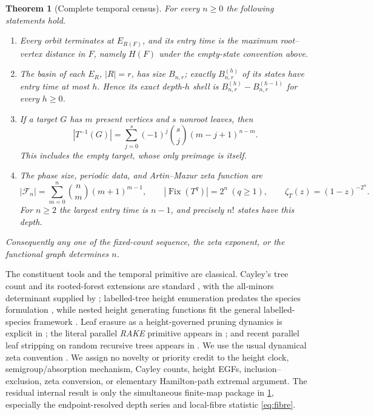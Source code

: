 \documentclass[10pt,a4paper]{amsart}
\newtheorem{theorem}{Theorem}
\theoremstyle{definition}
\newcommand{\F}{\mathcal F}
\newcommand{\Fix}{\operatorname{Fix}}
\begin{document}
\begin{theorem}[Complete temporal census]\label{thm:main}
For every $n\geq0$ the following statements hold.
\begin{enumerate}[label=\textup{(\roman*)}]
\item Every orbit terminates at $E_{R(F)}$, and its entry time is the maximum
root--vertex distance in $F$, namely $H(F)$ under the empty-state convention
above.
\item The basin of each $E_R$, $|R|=r$, has size $B_{n,r}$; exactly
$B_{n,r}^{(h)}$ of its states have entry time at most $h$.  Hence its exact
depth-$h$ shell is $B_{n,r}^{(h)}-B_{n,r}^{(h-1)}$ for every $h\geq0$.
\item If a target $G$ has $m$ present vertices and $s$ nonroot leaves, then
\[
 |T^{-1}(G)|=\sum_{j=0}^{s}(-1)^j\binom{s}{j}(m-j+1)^{n-m}.   \tag{1.5}\label{eq:fibre}
\]
This includes the empty target, whose only preimage is itself.
\item The phase size, periodic data, and Artin--Mazur zeta function are
\[
 |\F_n|=\sum_{m=0}^{n}\binom nm(m+1)^{m-1},\qquad
 |\Fix(T^q)|=2^n\ (q\geq1),\qquad
 \zeta_T(z)=(1-z)^{-2^n}.                                    \tag{1.6}\label{eq:periodic}
\]
For $n\geq2$ the largest entry time is $n-1$, and precisely $n!$ states have
this depth.
\end{enumerate}
Consequently any one of the fixed-count sequence, the zeta exponent, or the
functional graph determines $n$.
\end{theorem}

The constituent tools and the temporal primitive are classical.  Cayley's
tree count and its rooted-forest extensions are standard
\cite{Cayley1889,Moon1970}, with the all-minors determinant supplied by
\cite{Chaiken1982}; labelled-tree height enumeration predates the species
formulation \cite{Riordan1960,RenyiSzekeres1967}, while nested height
generating functions fit the general labelled-species framework
\cite{BergeronLabelleLeroux1998,FlajoletSedgewick2009}.  Leaf erasure as a
height-governed pruning dynamics is explicit in
\cite{KovchegovZaliapin2020}; the literal parallel \emph{RAKE} primitive
appears in \cite{MillerReif1985}; and recent parallel leaf stripping on random
recursive trees appears in \cite{AddarioBerryEtAl2025}.  We use the usual
dynamical zeta convention \cite{ArtinMazur1965}.  We assign no novelty or
priority credit to the height clock, semigroup/absorption mechanism, Cayley
counts, height EGFs, inclusion--exclusion, zeta conversion, or elementary
Hamilton-path extremal argument.  The residual internal result is only the
simultaneous finite-map package in \cref{thm:main}, especially the
endpoint-resolved depth series and local-fibre statistic \eqref{eq:fibre}.
\end{document}
